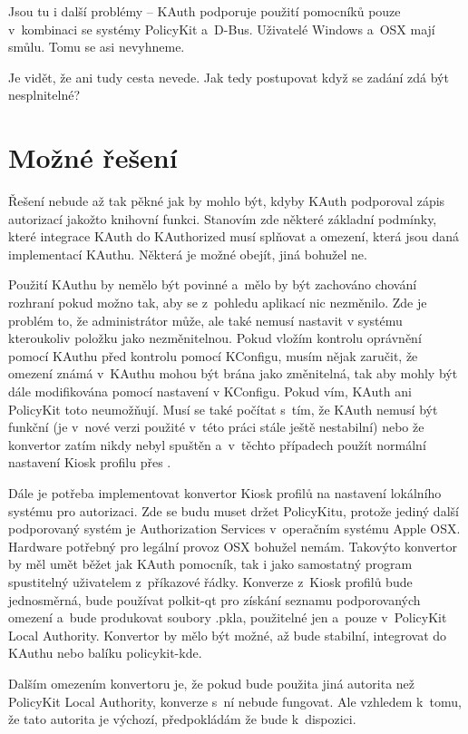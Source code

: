 Jsou tu i další problémy -- KAuth podporuje použití pomocníků pouze v~kombinaci se systémy PolicyKit a~D-Bus. Uživatelé Windows a~OSX mají smůlu. Tomu se asi nevyhneme.

Je vidět, že ani tudy cesta nevede. Jak tedy postupovat když se zadání zdá být nesplnitelné?

\section{Možné řešení}\label{mozres}
Řešení nebude až tak pěkné jak by mohlo být, kdyby KAuth podporoval zápis autorizací jakožto knihovní funkci. Stanovím zde některé základní podmínky, které integrace KAuth do KAuthorized musí splňovat a omezení, která jsou daná implementací KAuthu. Některá je možné obejít, jiná bohužel ne.

Použití KAuthu by nemělo být povinné a~mělo by být zachováno chování rozhraní  pokud možno tak, aby se z~pohledu aplikací nic nezměnilo. Zde je problém to, že administrátor může, ale také nemusí nastavit v systému  kteroukoliv položku jako nezměnitelnou. Pokud vložím kontrolu oprávnění pomocí KAuthu před kontrolu pomocí KConfigu, musím nějak zaručit, že omezení známá v~KAuthu mohou být brána jako změnitelná, tak aby mohly být dále modifikována pomocí nastavení v KConfigu. Pokud vím, KAuth ani PolicyKit toto neumožňují. Musí se také počítat s~tím, že KAuth nemusí být funkční (je v~nové verzi použité v~této práci stále ještě nestabilní) nebo že konvertor zatím nikdy nebyl spuštěn a~v~těchto případech použít normální nastavení Kiosk profilu přes .

Dále je potřeba implementovat konvertor Kiosk profilů na nastavení lokálního systému pro autorizaci. Zde se budu muset držet PolicyKitu, protože jediný další podporovaný systém je Authorization Services v~operačním systému Apple OSX. Hardware potřebný pro legální provoz OSX bohužel nemám. Takovýto konvertor by měl umět běžet jak KAuth pomocník, tak i jako samostatný program spustitelný uživatelem z~příkazové řádky. Konverze z~Kiosk profilů bude jednosměrná, bude používat polkit-qt pro získání seznamu podporovaných omezení a~bude produkovat soubory .pkla, použitelné jen a~pouze v~PolicyKit Local Authority. Konvertor by mělo být možné, až bude stabilní, integrovat do KAuthu nebo balíku policykit-kde.

Dalším omezením konvertoru je, že pokud bude použita jiná autorita než PolicyKit Local Authority, konverze s~ní nebude fungovat. Ale vzhledem k~tomu, že tato autorita je výchozí, předpokládám že bude k~dispozici.

